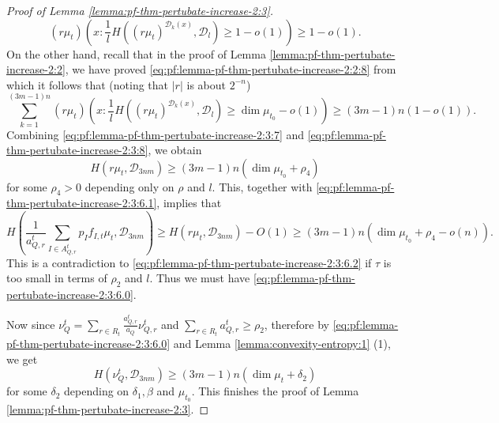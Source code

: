 \documentclass[a4paper,11pt]{amsart}
\theoremstyle{definition}
\numberwithin{equation}{section}
\def\D{\mathcal{D}}
\begin{document}
\begin{proof}[Proof of Lemma \ref{lemma:pf-thm-pertubate-increase-2:3}]
\begin{equation}\label{eq:pf:lemma-pf-thm-pertubate-increase-2:3:7}
(r\mu_t)\left(x: \frac{1}{l}H\left((r\mu_t)^{\D_k(x)}, \D_l\right) \ge 1-o(1) \right) \ge 1-o(1).
\end{equation}
On the other hand,  recall that in the proof of Lemma \ref{lemma:pf-thm-pertubate-increase-2:2}, we have proved \eqref{eq:pf:lemma-pf-thm-pertubate-increase-2:2:8} from which it follows that  (noting that $|r|$ is about $2^{-n}$)
\begin{equation}\label{eq:pf:lemma-pf-thm-pertubate-increase-2:3:8}
\sum_{k=1}^{(3m-1)n}(r\mu_t)\left(x: \frac{1}{l}H\left((r\mu_t)^{\D_k(x)}, \D_l\right) \ge \dim\mu_{t_0}-o(1) \right) \ge (3m-1)n(1-o(1)).
\end{equation}
Combining \eqref{eq:pf:lemma-pf-thm-pertubate-increase-2:3:7} and \eqref{eq:pf:lemma-pf-thm-pertubate-increase-2:3:8},  we obtain
\[
H(r\mu_{t},\D_{3nm}) \ge (3m-1)n (\dim\mu_{t_0}+\rho_4)
\]
for some $\rho_4>0$ depending only on $\rho$ and $l$. This, together with \eqref{eq:pf:lemma-pf-thm-pertubate-increase-2:3:6.1},  implies that 
\[
H\left(\frac{1}{a_{Q,r}^t}\sum_{I\in A_{Q,r}^t}p_I f_{I,t}\mu_t ,\D_{3nm}\right) \ge H(r\mu_t,\D_{3nm})-O(1) \ge (3m-1)n(\dim\mu_{t_0}+\rho_4-o(n)).
\]
This is a contradiction to \eqref{eq:pf:lemma-pf-thm-pertubate-increase-2:3:6.2} if $\tau$ is too small in terms of $\rho_2$ and $l$.   Thus we must have \eqref{eq:pf:lemma-pf-thm-pertubate-increase-2:3:6.0}.

Now since $\nu_{Q}^t=\sum_{r\in R_t}\frac{a_{Q,r}^t}{a_Q}\nu_{Q,r}^t$ and $\sum_{r\in R_t}a_{Q,r}^t\ge \rho_2$,  therefore by \eqref{eq:pf:lemma-pf-thm-pertubate-increase-2:3:6.0} and Lemma \ref{lemma:convexity-entropy:1} (1),  we get
\[
H(\nu^t_Q,\D_{3nm}) \ge (3m-1)n(\dim\mu_t+\delta_2)
\]
for some $\delta_2$ depending on $\delta_1, \beta$ and $\mu_{t_0}$.  This finishes the proof of Lemma \ref{lemma:pf-thm-pertubate-increase-2:3}.
\end{proof}
\end{document}
